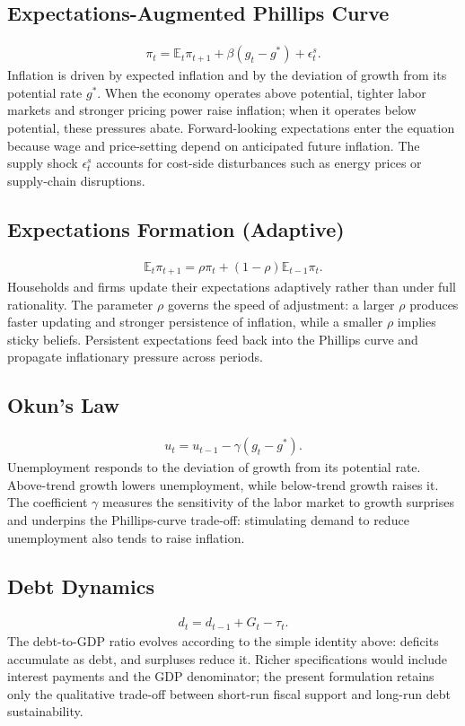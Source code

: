 \documentclass[11pt]{article}
\begin{document}
\subsection{Expectations-Augmented Phillips Curve}
\begin{align}
    \pi_t = \mathbb{E}_t\pi_{t+1} + \beta (g_t - g^*) + \epsilon_t^s.
\end{align}
Inflation is driven by expected inflation and by the deviation of growth from its potential rate $g^*$. When the economy operates above potential, tighter labor markets and stronger pricing power raise inflation; when it operates below potential, these pressures abate. Forward-looking expectations enter the equation because wage and price-setting depend on anticipated future inflation. The supply shock $\epsilon_t^s$ accounts for cost-side disturbances such as energy prices or supply-chain disruptions.

\subsection{Expectations Formation (Adaptive)}
\begin{align*}
    \mathbb{E}_t\pi_{t+1} = \rho \pi_t + (1-\rho) \mathbb{E}_{t-1}\pi_t.
\end{align*}
Households and firms update their expectations adaptively rather than under full rationality. The parameter $\rho$ governs the speed of adjustment: a larger $\rho$ produces faster updating and stronger persistence of inflation, while a smaller $\rho$ implies sticky beliefs. Persistent expectations feed back into the Phillips curve and propagate inflationary pressure across periods.

\subsection{Okun's Law}
\begin{align*}
    u_t = u_{t-1} - \gamma (g_t - g^*).
\end{align*}
Unemployment responds to the deviation of growth from its potential rate. Above-trend growth lowers unemployment, while below-trend growth raises it. The coefficient $\gamma$ measures the sensitivity of the labor market to growth surprises and underpins the Phillips-curve trade-off: stimulating demand to reduce unemployment also tends to raise inflation.

\subsection{Debt Dynamics}
\begin{align*}
    d_t = d_{t-1} + G_t - \tau_t.
\end{align*}
The debt-to-GDP ratio evolves according to the simple identity above: deficits accumulate as debt, and surpluses reduce it. Richer specifications would include interest payments and the GDP denominator; the present formulation retains only the qualitative trade-off between short-run fiscal support and long-run debt sustainability.
\end{document}
